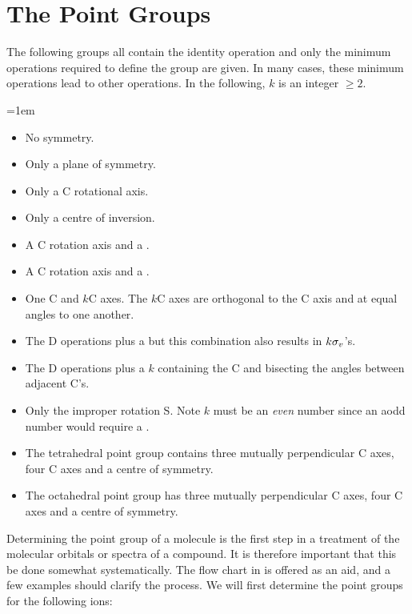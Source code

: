 \section{The Point Groups}

The following groups all contain the identity operation and only the minimum operations required to define the group are given.
In many cases, these minimum operations lead to other operations.
In the following, $k$ is an integer $≥2$.

\begingroup\baselineskip=1em
\begin{itemize}
    \item[\PG{C}{1}] No symmetry.
    \item[\PG{C}{s}] Only a plane of symmetry.
    \item[\PG{C}{k}] Only a \symop[k]C rotational axis.
    \item[\PG{C}{i}] Only a centre of inversion.
    \item[\PG{C}{kh}] A \symop[k]C rotation axis and a \symop[h]{\sigma}.
    \item[\PG{C}{kv}] A \symop[k]C rotation axis and a \symop[v]{\sigma}.
    \item[\PG{D}{k}] One \symop[k]C and $k$\symop[2]C axes. The $k$\symop[2]C axes are orthogonal to the \symop[k]C axis and at equal angles to one another.
    \item[\PG{D}{kh}] The \symop[k]D operations plus a \symop[h]{\sigma} but this combination also results in $k\symop[v]{\sigma}$’s.
    \item[\PG{D}{kd}] The \symop[k]D operations plus a $k$\symop[d]{\sigma} containing the \symop[k]C and bisecting the angles between adjacent \symop[2]C’s.
    \item[\PG{S}{k}] Only the improper rotation \symop[k]S. Note $k$ must be an \emph{even} number since an aodd number would require a \symop[h]{\sigma}.
    \item[\PG{T}{d}] The tetrahedral point group contains three mutually perpendicular \symop[2]C axes, four \symop[3]C axes and a centre of symmetry.
    \item[\PG{O}{h}] The octahedral point group has three mutually perpendicular \symop[4]C axes, four \symop[3]C axes and a centre of symmetry.
\end{itemize}
\endgroup

Determining the point group of a molecule is the first step in a treatment of the molecular orbitals or spectra of a compound.
It is therefore important that this be done somewhat systematically.
The flow chart in  is offered as an aid, and a few examples should clarify the process.
We will first determine the point groups for the following  ions:


